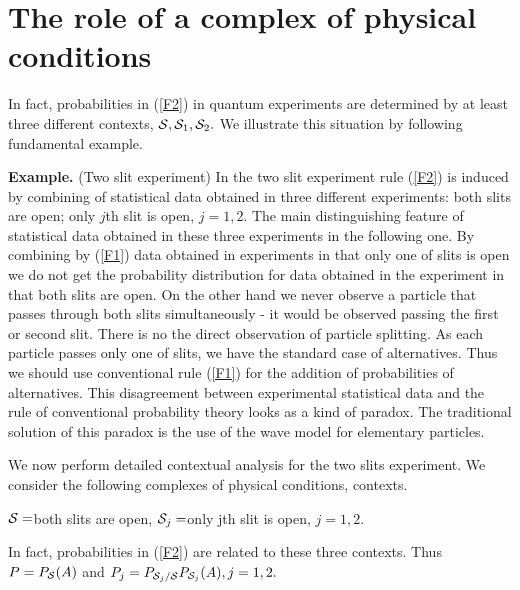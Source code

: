 \documentclass[12pt,oneside,final,a4paper]{article}
\begin{document}
\section{The role of a complex of physical conditions}

In fact, probabilities in (\ref{F2}) in quantum experiments 
are determined by at least three different contexts,
${\cal S}, {\cal S}_1, {\cal S}_2.$ We illustrate this situation by following fundamental example.

{\bf Example.} (Two slit experiment) In the two slit experiment rule (\ref{F2}) is induced by
combining of statistical data obtained in three different experiments: 
both slits are open; only $j$th slit is open, $j=1,2.$ The main distinguishing feature
of statistical data obtained in these three experiments in the following one. 
By combining by (\ref{F1}) data
obtained in experiments in that only one of slits is open we do not get the probability distribution for
data obtained in the experiment in that both slits are open. On the other hand we never observe a particle
that passes through both slits simultaneously - it would be observed passing the first or second 
slit. There  is no the direct observation of particle splitting. As each particle passes  only one of slits,
we have the standard case of alternatives. Thus we should use conventional rule (\ref{F1}) for
the addition of probabilities of alternatives. This disagreement between experimental statistical
data and the rule of conventional probability theory looks as a kind of paradox. The traditional
solution of this paradox is the use of the wave model for elementary particles.

We now perform detailed contextual analysis for the two slits experiment. We consider the following
complexes of physical conditions, contexts.

${\cal S}=${both slits are open}, ${\cal S}_j=${only jth slit is open}, $j=1,2.$ 

In fact, probabilities in (\ref{F2}) are related to these three contexts.
Thus $P=P_{{\cal S}}(A)$ and $P_j= P_{{\cal S}_j/{\cal S}} P_{{\cal S}_j}(A), j=1,2.$ 
\end{document}
